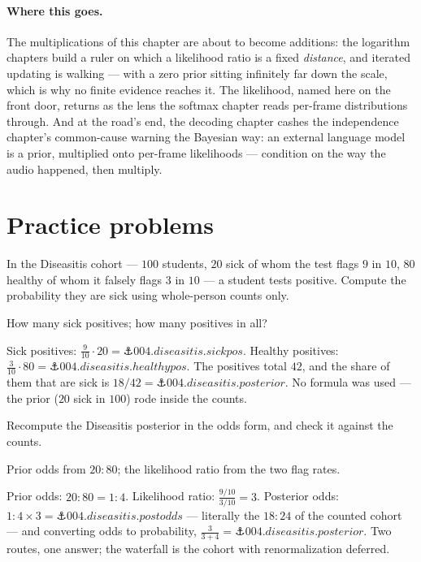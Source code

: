 \begin{narrative}
\paragraph{Where this goes.} The multiplications of this chapter are
about to become additions: the logarithm chapters build a ruler on
which a likelihood ratio is a fixed \emph{distance}, and iterated
updating is walking — with a zero prior sitting infinitely far down
the scale, which is why no finite evidence reaches it. The likelihood,
named here on the front door, returns as the lens the softmax chapter
reads per-frame distributions through. And at the road's end, the
decoding chapter cashes the independence chapter's common-cause
warning the Bayesian way: an external language model is a prior,
multiplied onto per-frame likelihoods — condition on the way the
audio happened, then multiply.
\end{narrative}

\section*{Practice problems}

\begin{problem}
In the Diseasitis cohort — $100$ students, $20$ sick of whom the test
flags $9$ in $10$, $80$ healthy of whom it falsely flags $3$ in $10$ —
a student tests positive. Compute the probability they are sick using
whole-person counts only.
\begin{hint}
How many sick positives; how many positives in all?
\end{hint}
\begin{solution}
Sick positives: $\tfrac{9}{10} \cdot 20 =
\anchor{004.diseasitis.sickpos}$. Healthy positives:
$\tfrac{3}{10} \cdot 80 = \anchor{004.diseasitis.healthypos}$. The
positives total $42$, and the share of them that are sick is
$18/42 = \anchor{004.diseasitis.posterior}$. No formula was used — the
prior ($20$ sick in $100$) rode inside the counts.
\end{solution}
\end{problem}

\begin{problem}
Recompute the Diseasitis posterior in the odds form, and check it
against the counts.
\begin{hint}
Prior odds from $20{:}80$; the likelihood ratio from the two flag
rates.
\end{hint}
\begin{solution}
Prior odds: $20{:}80 = 1{:}4$. Likelihood ratio:
$\tfrac{9/10}{3/10} = 3$. Posterior odds:
$1{:}4 \times 3 = \anchor{004.diseasitis.postodds}$ — literally the
$18{:}24$ of the counted cohort — and converting odds to probability,
$\tfrac{3}{3+4} = \anchor{004.diseasitis.posterior}$. Two routes, one
answer; the waterfall is the cohort with renormalization deferred.
\end{solution}
\end{problem}

